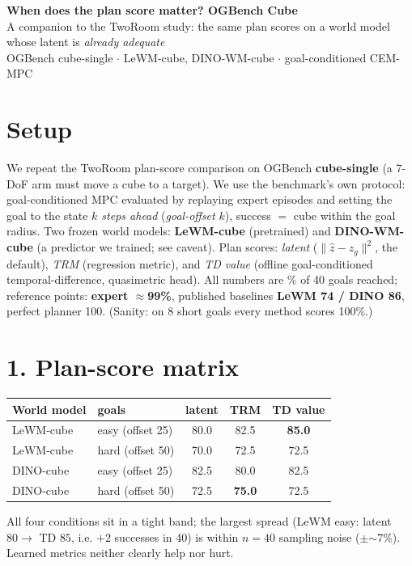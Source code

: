 \documentclass[11pt]{article}
\newcommand{\g}[1]{\textcolor{good}{\textbf{#1}}}
\begin{document}
\begin{center}
{\LARGE\bfseries When does the plan score matter? OGBench Cube}\\[3pt]
{\large A companion to the TwoRoom study: the same plan scores on a world model whose latent is \emph{already adequate}}\\[4pt]
{\small OGBench \textsf{cube-single} $\cdot$ \textsf{LeWM-cube}, \textsf{DINO-WM-cube} $\cdot$ goal-conditioned CEM-MPC}
\end{center}
\vspace{0.4em}

\section{Setup}
We repeat the TwoRoom plan-score comparison on OGBench \textbf{cube-single} (a 7-DoF arm must move a cube to a
target). We use the benchmark's own protocol: goal-conditioned MPC evaluated by replaying expert episodes and
setting the goal to the state \emph{$k$ steps ahead} (\emph{goal-offset} $k$), success $=$ cube within the goal
radius. Two frozen world models: \textbf{LeWM-cube} (pretrained) and \textbf{DINO-WM-cube} (a predictor we
trained; see caveat). Plan scores: \emph{latent} ($\lVert\hat z-z_g\rVert^2$, the default), \emph{TRM}
(regression metric), and \emph{TD value} (offline goal-conditioned temporal-difference, quasimetric head). All
numbers are \% of 40 goals reached; reference points: \textbf{expert $\approx$99\%}, published baselines
\textbf{LeWM 74 / DINO 86}, perfect planner 100. (Sanity: on 8 short goals every method scores 100\%.)

\section{1. Plan-score matrix}
\begin{center}\small
\renewcommand{\arraystretch}{1.25}
\begin{tabular}{ll ccc}
\toprule
\textbf{World model} & \textbf{goals} & \textbf{latent} & \textbf{TRM} & \textbf{TD value} \\
\midrule
\textsf{LeWM-cube} & easy (offset 25) & 80.0 & 82.5 & \g{85.0} \\
\textsf{LeWM-cube} & hard (offset 50) & 70.0 & 72.5 & 72.5 \\
\addlinespace[2pt]
\textsf{DINO-cube} & easy (offset 25) & 82.5 & 80.0 & 82.5 \\
\textsf{DINO-cube} & hard (offset 50) & 72.5 & \g{75.0} & 72.5 \\
\bottomrule
\end{tabular}
\end{center}
All four conditions sit in a tight band; the largest spread (LeWM easy: latent $80\!\to\!$ TD $85$, i.e. $+2$
successes in 40) is within $n{=}40$ sampling noise ($\pm$$\sim$7\%). Learned metrics neither clearly help nor hurt.
\end{document}
